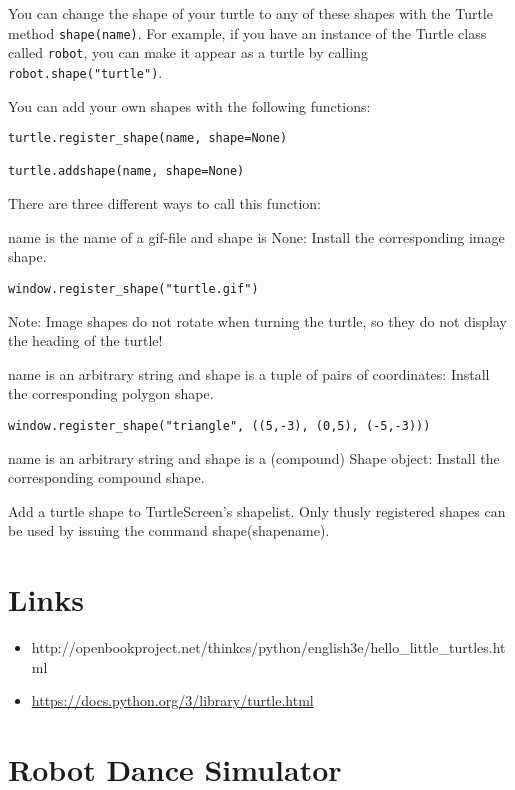 You can change the shape of your turtle to any of these shapes with the
Turtle method \texttt{shape(name)}. For example, if you have an instance
of the Turtle class called \texttt{robot}, you can make it appear as a
turtle by calling \texttt{robot.shape("turtle")}.

You can add your own shapes with the following functions:

\begin{verbatim}
turtle.register_shape(name, shape=None)

turtle.addshape(name, shape=None)
\end{verbatim}

There are three different ways to call this function:

name is the name of a gif-file and shape is None: Install the
corresponding image shape.

\begin{verbatim}
window.register_shape("turtle.gif")
\end{verbatim}

Note: Image shapes do not rotate when turning the turtle, so they do not
display the heading of the turtle!

name is an arbitrary string and shape is a tuple of pairs of
coordinates: Install the corresponding polygon shape.

\begin{verbatim}
window.register_shape("triangle", ((5,-3), (0,5), (-5,-3)))
\end{verbatim}

name is an arbitrary string and shape is a (compound) Shape object:
Install the corresponding compound shape.

Add a turtle shape to TurtleScreen's shapelist. Only thusly registered
shapes can be used by issuing the command shape(shapename).

\section{Links}\label{links}

\begin{itemize}
\tightlist
\item
  http://openbookproject.net/thinkcs/python/english3e/hello\_little\_turtles.html
\item
  \url{https://docs.python.org/3/library/turtle.html}
\end{itemize}

\section{Robot Dance Simulator}\label{robot-dance-simulator}

